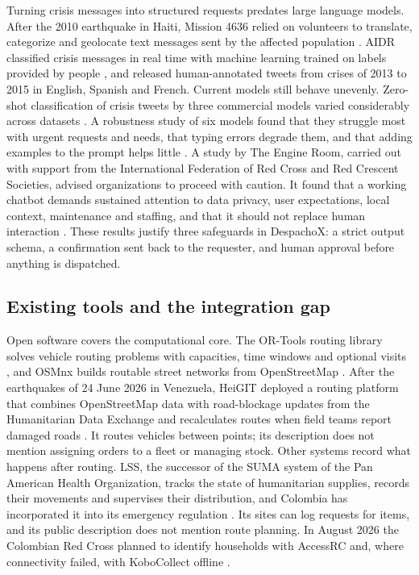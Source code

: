 \documentclass[11pt]{article}
\begin{document}
Turning crisis messages into structured requests predates large language models. After the 2010 earthquake in Haiti, Mission 4636 relied on volunteers to translate, categorize and geolocate text messages sent by the affected population \citep{munro2013crowdsourcing}. AIDR classified crisis messages in real time with machine learning trained on labels provided by people \citep{imran2014aidr}, and \citet{imran2016twitter} released human-annotated tweets from crises of 2013 to 2015 in English, Spanish and French. Current models still behave unevenly. Zero-shot classification of crisis tweets by three commercial models varied considerably across datasets \citep{mcdaniel2024zeroshot}. A robustness study of six models found that they struggle most with urgent requests and needs, that typing errors degrade them, and that adding examples to the prompt helps little \citep{imran2025robustness}. A study by The Engine Room, carried out with support from the International Federation of Red Cross and Red Crescent Societies, advised organizations to proceed with caution. It found that a working chatbot demands sustained attention to data privacy, user expectations, local context, maintenance and staffing, and that it should not replace human interaction \citep{engineroom2023chatbots}. These results justify three safeguards in DespachoX: a strict output schema, a confirmation sent back to the requester, and human approval before anything is dispatched.

\subsection{Existing tools and the integration gap}

Open software covers the computational core. The OR-Tools routing library solves vehicle routing problems with capacities, time windows and optional visits \citep{ortools_routing}, and OSMnx builds routable street networks from OpenStreetMap \citep{boeing2017osmnx}. After the earthquakes of 24 June 2026 in Venezuela, HeiGIT deployed a routing platform that combines OpenStreetMap data with road-blockage updates from the Humanitarian Data Exchange and recalculates routes when field teams report damaged roads \citep{heigit2026venezuela}. It routes vehicles between points; its description does not mention assigning orders to a fleet or managing stock. Other systems record what happens after routing. LSS, the successor of the SUMA system of the Pan American Health Organization, tracks the state of humanitarian supplies, records their movements and supervises their distribution, and Colombia has incorporated it into its emergency regulation \citep{paho_lss}. Its sites can log requests for items, and its public description does not mention route planning. In August 2026 the Colombian Red Cross planned to identify households with AccessRC and, where connectivity failed, with KoboCollect offline \citep{ifrc2026dref}.
\end{document}
